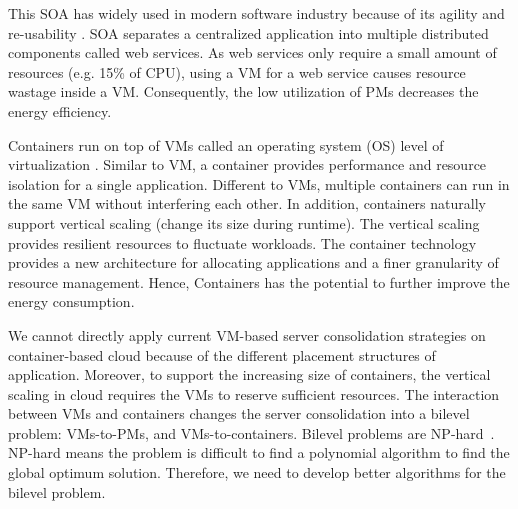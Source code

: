  This SOA has widely used in modern software industry because of its agility and re-usability \cite{Sprott:2004wt}.
SOA separates a centralized application into multiple distributed components called web services. 
As web services only require a small amount of resources (e.g. 15\% of CPU), 
using a VM for a web service causes resource wastage inside a VM. Consequently, the low utilization of PMs decreases
the energy efficiency.


 Containers run on top of 
VMs called an operating system (OS) level of virtualization \cite{Soltesz:2007cu}. Similar to VM, 
a container provides performance and resource isolation for a single application. 
Different to VMs, multiple containers can run in the same VM without interfering each other. 
In addition, containers naturally support vertical scaling (change its size during runtime)\cite{Vaquero:2011gb}. 
The vertical scaling provides resilient resources to fluctuate workloads. The container technology provides a new 
architecture for allocating applications and a finer granularity of resource management. Hence, Containers has the potential to further
improve the energy consumption.



We cannot directly apply current VM-based server consolidation strategies on container-based cloud because 
of the different placement structures of application. Moreover, to support the increasing size of containers, 
the vertical scaling in cloud requires the VMs to reserve sufficient resources. The interaction between VMs and containers changes 
the server consolidation into a bilevel problem: VMs-to-PMs, and VMs-to-containers. Bilevel problems are NP-hard~\cite{Sinha:2013tn}.  NP-hard means the problem is difficult to find a polynomial algorithm to find the global optimum solution. Therefore, we need to develop better algorithms for the bilevel problem.





